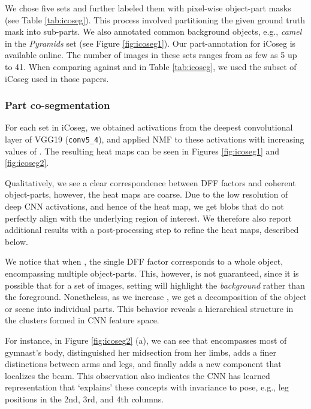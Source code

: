 \documentclass[runningheads]{llncs}
\begin{document}
	We chose five sets and further labeled them with pixel-wise object-part masks (see Table \ref{tab:icoseg}). This process involved partitioning the given ground truth mask into sub-parts.  We also annotated common background objects, e.g., \emph{camel} in the \emph{Pyramids} set (see Figure \ref{fig:icoseg1}). Our part-annotation for iCoseg is available online. The number of images in these sets ranges from as few as 5 up to 41. When comparing against \cite{vicente2011object} and \cite{rubio2012unsupervised} in Table \ref{tab:icoseg}, we used the subset of iCoseg used in those papers.

		
	
	\subsubsection{Part co-segmentation} \label{sec:icoseg_eval}
	For each set in iCoseg, we obtained activations from the deepest convolutional layer of VGG19 ({\tt conv5\_4}), and applied NMF to these activations with increasing values of . The resulting heat maps can be seen in Figures \ref{fig:icoseg1} and \ref{fig:icoseg2}.
	
	Qualitatively, we see a clear correspondence between DFF factors and coherent object-parts, however, the heat maps are coarse. Due to the low resolution of deep CNN activations, and hence of the heat map, we get blobs that do not perfectly align with the underlying region of interest. We therefore also report additional results with a post-processing step to refine the heat maps, described below.
	
	We notice that when , the single DFF factor corresponds to a whole object, encompassing multiple object-parts. This, however, is not guaranteed, since it is possible that for a set of images, setting  will highlight the \emph{background} rather than the foreground. 
	Nonetheless, as we increase , we get a decomposition of the object or scene into individual parts. This behavior reveals a hierarchical structure in the clusters formed in CNN feature space. 
	
	For instance, in Figure \ref{fig:icoseg2} (a), we can see that  encompasses most of gymnast's body,  distinguished her midsection from her limbs,  adds a finer distinctions between arms and legs, and finally  adds a new component that localizes the beam. This observation also indicates the CNN has learned representation that `explains' these concepts with invariance to pose, e.g., leg positions in the 2nd, 3rd, and 4th columns.
	
\end{document}
